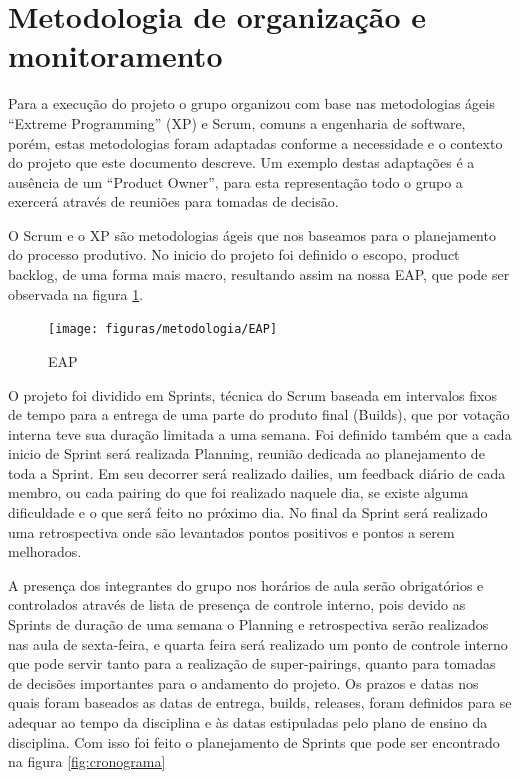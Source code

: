 \section{Metodologia de organização e monitoramento}

Para a execução do projeto o grupo organizou com base nas metodologias ágeis “Extreme Programming” (XP) e Scrum, comuns a engenharia de software, porém, estas metodologias foram adaptadas conforme a necessidade e o contexto do projeto que este documento descreve. Um exemplo destas adaptações é a ausência de um “Product Owner”, para esta representação todo o grupo a exercerá através de reuniões para tomadas de decisão.

O Scrum e o XP são metodologias ágeis que nos baseamos para o planejamento do processo produtivo. No inicio do projeto foi definido o escopo, product backlog, de uma forma mais macro, resultando assim na nossa EAP, que pode ser observada na figura \ref{fig:eap}.

\begin{figure}[!htb]
\centering
  \texttt{[image: figuras/metodologia/EAP]}
\caption{EAP}
\label{fig:eap}
\end{figure}

O projeto foi dividido em Sprints, técnica do Scrum baseada em intervalos fixos de tempo para a entrega de uma parte do produto final (Builds), que por votação interna teve sua duração limitada a uma semana. Foi definido também que a cada inicio de Sprint será realizada Planning, reunião dedicada ao planejamento de toda a Sprint. Em seu decorrer será realizado dailies, um feedback diário de cada membro, ou cada pairing do que foi realizado naquele dia, se existe alguma dificuldade e o que será feito no próximo dia. No final da Sprint será realizado uma retrospectiva onde são levantados pontos positivos e pontos a serem melhorados.

A presença dos integrantes do grupo nos horários de aula serão obrigatórios e controlados através de lista de presença de controle interno, pois devido as Sprints de duração de uma semana o Planning e retrospectiva serão realizados nas aula de sexta-feira, e quarta feira será realizado um ponto de controle interno que pode servir tanto para a realização de super-pairings, quanto para tomadas de decisões importantes para o andamento do projeto.
Os prazos e datas nos quais foram baseados as datas de entrega, builds, releases, foram definidos para se adequar ao tempo da disciplina e às datas estipuladas pelo plano de ensino da disciplina. Com isso foi feito o planejamento de Sprints que pode ser encontrado na figura \ref{fig:cronograma}

